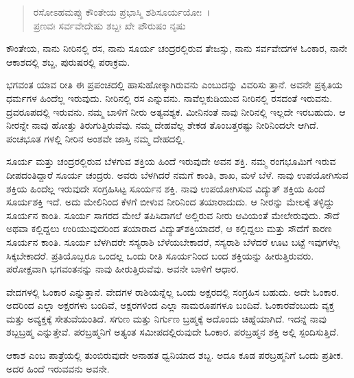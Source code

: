 \begin{verse}
ರಸೋಽಹಮಪ್ಸು ಕೌಂತೇಯ ಪ್ರಭಾಸ್ಮಿ ಶಶಿಸೂರ್ಯಯೋಃ~।\\ಪ್ರಣವಃ ಸರ್ವವೇದೇಷು ಶಬ್ದಃ ಖೇ ಪೌರುಷಂ ನೃಷು 
\end{verse}

{\small ಕೌಂತೇಯ, ನಾನು ನೀರಿನಲ್ಲಿ ರಸ, ನಾನು ಸೂರ್ಯ ಚಂದ್ರರಲ್ಲಿರುವ ತೇಜಸ್ಸು, ನಾನು ಸರ್ವವೇದಗಳ ಓಂಕಾರ, ನಾನೇ ಆಕಾಶದಲ್ಲಿ ಶಬ್ದ, ಪುರುಷರಲ್ಲಿ ಪರಾಕ್ರಮ.}

ಭಗವಂತ ಯಾವ ರೀತಿ ಈ ಪ್ರಪಂಚದಲ್ಲಿ ಹಾಸುಹೋಕ್ಕಾಗಿರುವನು ಎಂಬುದನ್ನು ವಿವರಿಸು ತ್ತಾನೆ. ಅವನೇ ಪ್ರಕೃತಿಯ ಧರ್ಮಗಳ ಹಿಂದೆಲ್ಲ ಇರುವುದು. ನೀರಿನಲ್ಲಿ ರಸ ಎನ್ನುವನು. ನಾವೆಲ್ಲಕುಡಿಯುವ ನೀರಿನಲ್ಲಿ ರಸದಂತೆ ಇರುವನು. ದ್ರವರೂಪದಲ್ಲಿ ಇರುವನು. ನಮ್ಮ ಬಾಳಿಗೆ ನೀರು ಅತ್ಯವಶ್ಯಕ. ಮೀನಿನಂತೆ ನಾವು ನೀರಿನಲ್ಲಿ ಇಲ್ಲದೇ ಇರಬಹುದು. ಆ ನೀರನ್ನೇ ನಾವು ಹೋತ್ತು ತಿರುಗುತ್ತಿರುವೆವು. ನಮ್ಮ ದೇಹವೆಲ್ಲ ಶೇಕಡ ತೊಂಬತ್ತರಷ್ಟು ನೀರಿನಿಂದಲೇ ಆಗಿದೆ. ಪಂಚಭೂತ ಗಳಲ್ಲಿ ನೀರಿನ ಅಂಶವೇ ಜಾಸ್ತಿ ನಮ್ಮ ದೇಹದಲ್ಲಿ.

ಸೂರ್ಯ ಮತ್ತು ಚಂದ್ರರಲ್ಲಿರುವ ಬೆಳಗುವ ಶಕ್ತಿಯ ಹಿಂದೆ ಇರುವುದೇ ಅವನ ಶಕ್ತಿ. ನಮ್ಮ ರಂಗಭೂಮಿಗೆ ಇರುವ ದೀಪದಂತಿದ್ದಾರೆ ಸೂರ್ಯ ಚಂದ್ರರು. ಅವರು ಬೆಳಗಿದರೆ ನಮಗೆ ಕಾಂತಿ, ಶಾಖ, ಮಳೆ ಬೆಳೆ. ನಾವು ಉಪಯೋಗಿಸುವ ಶಕ್ತಿಯ ಹಿಂದೆಲ್ಲ ಇರುವುದೇ ಸಂಗ್ರಹಿಸಿಟ್ಟ ಸೂರ್ಯನ ಶಕ್ತಿ. ನಾವು ಉಪಯೋಗಿಸುವ ವಿದ್ಯುತ್ ಶಕ್ತಿಯ ಹಿಂದೆ ಸೂರ್ಯಶಕ್ತಿ ಇದೆ. ಅದು ಮೇಲಿನಿಂದ ಕೆಳಗೆ ಬೀಳುವ ನೀರಿನಿಂದ ತಯಾರಾದುದು. ಆ ನೀರನ್ನು ಮೇಲಕ್ಕೆ ತಳ್ಳಿದ್ದು ಸೂರ್ಯನ ಕಾಂತಿ. ಸೂರ್ಯ ಸಾಗರದ ಮೇಲೆ ತಪಿಸಿದಾಗಲೆ ಅಲ್ಲಿರುವ ನೀರು ಆವಿಯಂತೆ ಮೇಲೇರುವುದು. ಸೌದೆ ಅಥವಾ ಕಲ್ಲಿದ್ದಲು ಉರಿಯುವುದರಿಂದ ತಯಾರಾದ ವಿದ್ಯುತ್​ಶಕ್ತಿಯಾದರೆ, ಆ ಕಲ್ಲಿದ್ದಲು ಮತ್ತು ಸೌದೆಗೆ ಕಾರಣ ಸೂರ್ಯನ ಕಾಂತಿ. ಸೂರ್ಯ ಬೆಳಗಿದರೇ ಸಸ್ಯರಾಶಿ ಬೆಳೆಯಬೇಕಾದರೆ, ಸಸ್ಯರಾಶಿ ಬೆಳೆದರೆ ಊಟ ಬಟ್ಟೆ ಇವುಗಳೆಲ್ಲ ಸಿಕ್ಕಬೇಕಾದರೆ. ಪ್ರತಿಯೊಬ್ಬರೂ ಒಂದಲ್ಲ ಒಂದು ರೀತಿ ಸೂರ್ಯನಿಂದ ಬಂದ ಶಕ್ತಿಯನ್ನು ಹೀರುತ್ತಿರುವರು. ಪರೋಕ್ಷವಾಗಿ ಭಗವಂತನನ್ನು ನಾವು ಹೀರುತ್ತಿರುವೆವು. ಅವನೇ ಬಾಳಿಗೆ ಆಧಾರ.

ವೇದಗಳಲ್ಲಿ ಓಂಕಾರ ಎನ್ನುತ್ತಾನೆ. ವೇದಗಳ ರಾಶಿಯನ್ನೆಲ್ಲ ಒಂದು ಅಕ್ಷರದಲ್ಲಿ ಸಂಗ್ರಹಿಸ ಬಹುದು. ಅದೇ ಓಂಕಾರ. ಅದರಿಂದ ಎಲ್ಲಾ ಅಕ್ಷರಗಳು ಬಂದಿವೆ, ಅಕ್ಷರಗಳಿಂದ ಎಲ್ಲಾ ನಾಮರೂಪಗಳೂ ಬಂದಿವೆ. ಓಂಕಾರವೆಂಬುದು ವ್ಯಕ್ತ ಮತ್ತು ಅವ್ಯಕ್ತಕ್ಕೆ ಸೇತುವೆಯಂತಿದೆ. ಸಗುಣ ಮತ್ತು ನಿರ್ಗುಣ ಬ್ರಹ್ಮಕ್ಕೆ ಅದೊಂದು ಚಿಹ್ನೆಯಾಗಿದೆ. ಇದನ್ನೆ ನಾವು ಶಬ್ದಬ್ರಹ್ಮ ಎನ್ನುತ್ತೇವೆ. ಪರಬ್ರಹ್ಮನಿಗೆ ಅತ್ಯಂತ ಸಮೀಪದಲ್ಲಿರುವುದೇ ಓಂಕಾರ. ಪರಬ್ರಹ್ಮನ ಶಕ್ತಿ ಅಲ್ಲಿ ಸ್ಪಂದಿಸುತ್ತಿದೆ.

ಆಕಾಶ ಎಂಬ ಪಾತ್ರೆಯಲ್ಲಿ ತುಂಬಿರುವುದೇ ಅನಾಹತ ಧ್ವನಿಯಾದ ಶಬ್ದ. ಅದೂ ಕೂಡ ಪರಬ್ರಹ್ಮನಿಗೆ ಒಂದು ಪ್ರತೀಕ. ಅದರ ಹಿಂದೆ ಇರುವವನು ಅವನೇ.

